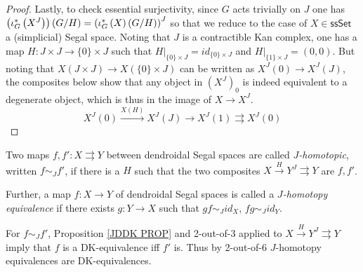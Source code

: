 \documentclass[a4paper,10pt
]{article}%
\begin{document}
\begin{proof}
Lastly, to check essential surjectivity, 
since $G$ acts trivially on $J$ one has
$\left(\iota_G^{\**}\left( X^J \right)\right)(G/H)=
\left(\iota_G^{\**}\left( X \right)(G/H)\right)^J$
so that we reduce to the case of $X \in \mathsf{ssSet}$ a (simplicial) Segal space.
Noting that $J$ is a contractible Kan complex,
one has a map 
$H \colon J \times J \to \{0\} \times J$
such that 
$H|_{\{0\}\times J} = id_{\{0\} \times J}$
and
$H|_{\{1\}\times J} = (0,0)$.
But noting that 
$X(J \times J) \to X(\{0\} \times J)$
can be written as 
$X^J(0) \to X^J(J)$, the composites below
show that any object in $\left(X^J\right)_0$ is indeed equivalent to a 
degenerate object, which is thus in the image of $X\to X^J$.
\[
	X^J(0) \xrightarrow{X(H)} 
	X^{J}(J) \to
	X^J(1) \rightrightarrows X^J(0)
\]
%
\end{proof}


\begin{definition}
	Two maps $f,f'\colon X \rightrightarrows Y$ between dendroidal Segal spaces are called \textit{$J$-homotopic}, written $f \sim_J f'$, if
	there is a $H$ such that
	the two composites
	$X \xrightarrow{H} Y^J \rightrightarrows Y$
	are $f,f'$.
	
	Further, a map $f\colon X \to Y$ of dendroidal Segal spaces is called a \textit{$J$-homotopy equivalence} if there exists $g \colon Y \to X$
	such that $gf \sim_J id_X$, $fg \sim_J id_Y$.
\end{definition}


\begin{remark}
	For $f\sim_J f'$, Proposition \ref{JDDK PROP} and 2-out-of-3 applied to $X \xrightarrow{H} Y^J \rightrightarrows Y$ imply that $f$ is a DK-equivalence iff $f'$ is.
	Thus by 2-out-of-6 $J$-homotopy equivalences are DK-equivalences.
\end{remark}
\end{document}
